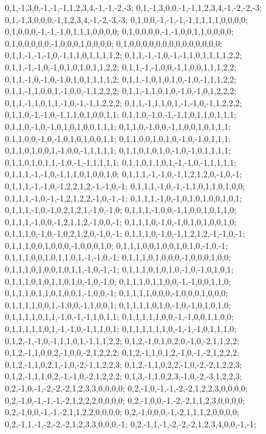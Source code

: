{{0,1,-1,3,0,-1,-1,-1,1,2,3,4,-1,-1,-2,-3; 0,1,-1,3,0,0,-1,-1,1,2,3,4,-1,-2,-2,-3; 0,1,-1,3,0,0,0,-1,1,2,3,4,-1,-2,-3,-3; 0,1,0,0,-1,-1,-1,-1,1,1,1,1,0,0,0,0; 0,1,0,0,0,-1,-1,-1,0,1,1,1,0,0,0,0; 0,1,0,0,0,0,-1,-1,0,0,1,1,0,0,0,0; 0,1,0,0,0,0,0,-1,0,0,0,1,0,0,0,0; 0,1,0,0,0,0,0,0,0,0,0,0,0,0,0,0; 0,1,1,-1,-1,-1,0,-1,1,1,0,1,1,1,1,2; 0,1,1,-1,-1,0,-1,-1,1,0,1,1,1,1,2,2; 0,1,1,-1,-1,0,-1,0,1,0,1,0,1,1,2,2; 0,1,1,-1,-1,0,0,-1,1,0,0,1,1,1,2,2;
0,1,1,-1,0,-1,0,-1,0,1,0,1,1,1,1,2; 0,1,1,-1,0,1,0,1,0,-1,0,-1,1,1,2,2; 0,1,1,-1,1,0,0,1,-1,0,0,-1,1,2,2,2; 0,1,1,-1,1,0,1,0,-1,0,-1,0,1,2,2,2; 0,1,1,-1,1,0,1,1,-1,0,-1,-1,1,2,2,2; 0,1,1,-1,1,1,0,1,-1,-1,0,-1,1,2,2,2; 0,1,1,0,-1,-1,0,-1,1,1,0,1,0,0,1,1; 0,1,1,0,-1,0,-1,-1,1,0,1,1,0,1,1,1; 0,1,1,0,-1,0,-1,0,1,0,1,0,0,1,1,1; 0,1,1,0,-1,0,0,-1,1,0,0,1,0,1,1,1; 0,1,1,0,0,-1,0,-1,0,1,0,1,0,0,1,1; 0,1,1,0,0,1,0,1,0,-1,0,-1,0,1,1,1;
0,1,1,0,1,0,0,1,-1,0,0,-1,1,1,1,1; 0,1,1,0,1,0,1,0,-1,0,-1,0,1,1,1,1; 0,1,1,0,1,0,1,1,-1,0,-1,-1,1,1,1,1; 0,1,1,0,1,1,0,1,-1,-1,0,-1,1,1,1,1; 0,1,1,1,-1,-1,0,-1,1,1,0,1,0,0,1,0; 0,1,1,1,-1,-1,0,-1,1,2,1,2,0,-1,0,-1; 0,1,1,1,-1,-1,0,-1,2,2,1,2,-1,-1,0,-1; 0,1,1,1,-1,0,-1,-1,1,0,1,1,0,1,0,0; 0,1,1,1,-1,0,-1,-1,2,1,2,2,-1,0,-1,-1; 0,1,1,1,-1,0,-1,0,1,0,1,0,0,1,0,1; 0,1,1,1,-1,0,-1,0,2,1,2,1,-1,0,-1,0; 0,1,1,1,-1,0,0,-1,1,0,0,1,0,1,1,0;
0,1,1,1,-1,0,0,-1,2,1,1,2,-1,0,0,-1; 0,1,1,1,0,-1,0,-1,0,1,0,1,0,0,1,0; 0,1,1,1,0,-1,0,-1,0,2,1,2,0,-1,0,-1; 0,1,1,1,0,-1,0,-1,1,2,1,2,-1,-1,0,-1; 0,1,1,1,0,0,1,0,0,0,-1,0,0,0,1,0; 0,1,1,1,0,0,1,0,0,1,0,1,0,-1,0,-1; 0,1,1,1,0,0,1,0,1,1,0,1,-1,-1,0,-1; 0,1,1,1,0,1,0,0,0,-1,0,0,0,1,0,0; 0,1,1,1,0,1,0,0,1,0,1,1,-1,0,-1,-1; 0,1,1,1,0,1,0,1,0,-1,0,-1,0,1,0,1; 0,1,1,1,0,1,0,1,1,0,1,0,-1,0,-1,0; 0,1,1,1,0,1,1,0,0,-1,-1,0,0,1,1,0;
0,1,1,1,0,1,1,0,1,0,0,1,-1,0,0,-1; 0,1,1,1,1,0,0,0,-1,0,0,0,1,0,0,0; 0,1,1,1,1,0,0,1,-1,0,0,-1,1,0,0,1; 0,1,1,1,1,0,1,0,-1,0,-1,0,1,0,1,0; 0,1,1,1,1,0,1,1,-1,0,-1,-1,1,0,1,1; 0,1,1,1,1,1,0,0,-1,-1,0,0,1,1,0,0; 0,1,1,1,1,1,0,1,-1,-1,0,-1,1,1,0,1; 0,1,1,1,1,1,1,0,-1,-1,-1,0,1,1,1,0; 0,1,2,-1,-1,0,-1,1,1,0,1,-1,1,1,2,2; 0,1,2,-1,0,1,0,2,0,-1,0,-2,1,1,2,2; 0,1,2,-1,1,0,0,2,-1,0,0,-2,1,2,2,2; 0,1,2,-1,1,0,1,2,-1,0,-1,-2,1,2,2,2;
0,1,2,-1,1,0,2,1,-1,0,-2,-1,1,2,2,3; 0,1,2,-1,1,0,2,2,-1,0,-2,-2,1,2,2,3; 0,1,2,-1,1,1,0,2,-1,-1,0,-2,1,2,2,2; 0,1,3,-1,1,0,2,3,-1,0,-2,-3,1,2,2,3; 0,2,-1,0,-1,-2,-2,-2,1,2,3,3,0,0,0,0; 0,2,-1,0,-1,-1,-2,-2,1,2,2,3,0,0,0,0; 0,2,-1,0,-1,-1,-1,-2,1,2,2,2,0,0,0,0; 0,2,-1,0,0,-1,-2,-2,1,1,2,3,0,0,0,0; 0,2,-1,0,0,-1,-1,-2,1,1,2,2,0,0,0,0; 0,2,-1,0,0,0,-1,-2,1,1,1,2,0,0,0,0; 0,2,-1,1,-1,-2,-2,-2,1,2,3,3,0,0,0,-1; 0,2,-1,1,-1,-2,-2,-2,1,2,3,4,0,0,-1,-1;
}}
